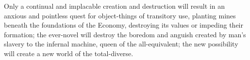 Only a continual and implacable creation and destruction will result in an anxious and pointless quest for object-things of transitory use, planting mines beneath the foundations of the Economy, destroying its values or impeding their formation; the ever-novel will destroy the boredom and anguish created by man's slavery to the infernal machine, queen of the all-equivalent; the new possibility will create a new world of the total-diverse.
